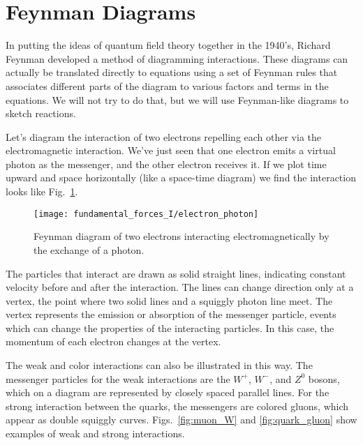 \section{Feynman Diagrams}
\label{sec:feynman_diagrams}
\label{section:feynman}

In putting the ideas of quantum field theory together in the
1940's, Richard Feynman developed a method of diagramming
interactions. These diagrams can actually be translated directly
to equations using a set of Feynman rules that associates
different parts of the diagram to various factors and terms in the
equations.  We will not try to do that, but we will use
Feynman-like diagrams to sketch reactions.

Let's diagram the interaction of two electrons repelling each
other via the electromagnetic interaction.  We've just seen that
one electron emits a virtual photon as the messenger, and the
other electron receives it.  If we plot time upward and space
horizontally (like a space-time diagram) we find the interaction
looks like Fig.~\ref{fig:electron_photon}.


\begin{figure}[b]
\begin{center}
\texttt{[image: fundamental\_forces\_I/electron\_photon]}
\caption{Feynman diagram of two electrons interacting
electromagnetically by the exchange of a photon.}
\label{fig:electron_photon}
\end{center}
\end{figure}

The particles that interact are drawn as solid straight lines,
indicating constant velocity before and after the interaction. The
lines can change direction only at a vertex, the point where two
solid lines and a squiggly photon line meet.  The vertex
represents the emission or absorption of the messenger particle,
events which can change the properties of the interacting
particles.  In this case, the momentum of each electron changes at
the vertex.

The weak and color interactions can also be illustrated in this
way. The messenger particles for the weak interactions are the
$W^+$, $W^-$, and $Z^0$ bosons, which on a diagram are represented
by closely spaced parallel lines.  For the strong interaction
between the quarks, the messengers are colored gluons, which
appear as double squiggly curves.  Figs.~\ref{fig:muon_W} and
\ref{fig:quark_gluon} show examples of weak and strong
interactions.

